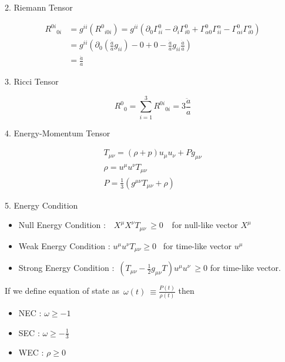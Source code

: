 \documentclass[10pt]{article}
\providecommand{\tightlist}{\setlength{\itemsep}{0pt}\setlength{\parskip}{0pt}}%
\begin{document}
2. Riemann Tensor

\begin{equation}
\begin{aligned}
{R^{0i}}_{0i} &= g^{ii}({R^0}_{i0i}) = g^{ii}\left(\partial_0 \Gamma^0_{ii} - \partial_i \Gamma^0_{i0} + \Gamma^0_{\alpha 0}\Gamma^\alpha_{ii} - \Gamma^0_{\alpha i} \Gamma^\alpha_{i0}\right) \\
&= g^{ii}\left(\partial_0\left(\frac{\dot{a}}{a}g_{ii}\right) - 0 + 0 - \frac{\dot{a}}{a}g_{ii}\frac{\dot{a}}{a}\right) \\
& = \frac{\ddot{a}}{a}
\end{aligned}
\end{equation}

3. Ricci Tensor

\begin{equation}
{R^0}_0 = \sum^{3}_{i=1} {R^{0i}}_{0i} = 3\frac{\ddot{a}}{a}
\end{equation}

4. Energy-Momentum Tensor

\begin{equation}
\begin{gathered}
T_{\mu\nu} = (\rho+p)u_\mu u_\nu + P g_{\mu\nu} \\
\rho = u^\mu u^\nu T_{\mu\nu} \\
P = \frac{1}{3}(g^{\mu\nu}T_{\mu\nu}+\rho)
\end{gathered}
\end{equation}

5. Energy Condition

\par\null

\begin{itemize}
\tightlist
\item
  Null Energy Condition :~~\(X^{\mu}X^{\nu}T_{\mu\nu}\ \ge0\ \)~ for null-like vector
  \(X^{\mu}\)
\item
  Weak Energy Condition : \(u^{\mu}u^{\nu}T_{\mu\nu}\ge0\)~ for time-like vector
  \(u^{\mu}\)
\item
  Strong Energy Condition :~\(\left(T_{\mu\nu}-\frac{1}{2}g_{\mu\nu}T\right)u^{\mu}u^{\nu}\ \ge0\) for time-like vector.
\end{itemize}

If we define equation of state as~\(\omega\left(t\right)\ \equiv\frac{P\left(t\right)}{\rho\left(t\right)}\) then~

\begin{itemize}
\tightlist
\item
  NEC : \(\omega\ge-1\)
\item
  SEC : \(\omega\ge-\frac{1}{3}\)
\item
  WEC : \(\rho\ge0\)
\end{itemize}
\end{document}
